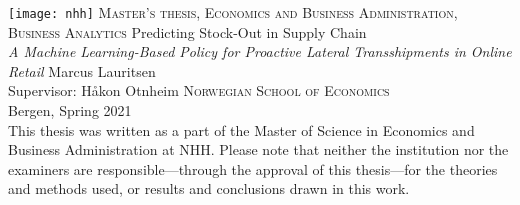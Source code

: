 \documentclass[../../main.tex]{subfiles}
\begin{document}
\begin{titlepage}
    \centering
    \texttt{[image: nhh]}
    \vfill
    \large{\textsc{Master's thesis, Economics and Business Administration, Business Analytics}}    
    \vfill
    \Huge{Predicting Stock-Out in Supply Chain}
    \\         
	\vspace{16pt}
    \large{\textit{A Machine Learning-Based Policy for Proactive Lateral Transshipments in Online Retail}}
    \vfill        
    \large{Marcus Lauritsen \\
    Supervisor: Håkon Otnheim}
    \vfill
    \vfill
    \normalsize
    \textsc{Norwegian School of Economics} \\
	Bergen, Spring 2021 \\
	\vspace{16pt}
    This thesis was written as a part of the Master of Science in Economics and Business Administration at NHH. Please note that neither the institution nor the examiners are responsible---through the approval of this thesis---for the theories and methods used, or results and conclusions drawn in this work.
\end{titlepage}
\end{document}
